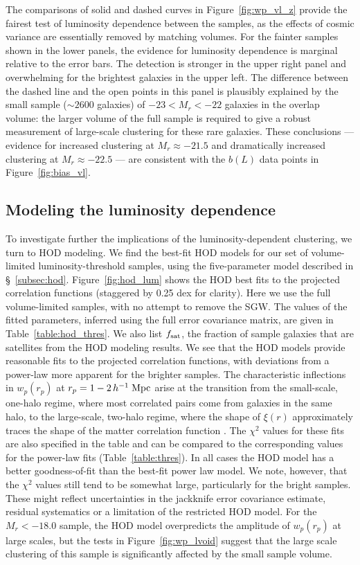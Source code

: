 \documentclass[]{emulateapj}
\newcommand{\hmpc}{\,h^{-1}\;{\rm Mpc}}
\newcommand{\wrp}{{w_p(r_p)}}
\begin{document}
The comparisons of solid and dashed curves in Figure~\ref{fig:wp_vl_z} 
provide the fairest test of luminosity dependence between the samples,
as the effects of cosmic variance are essentially removed by matching volumes.
For the fainter samples shown in the lower panels, the evidence for
luminosity dependence is marginal relative to the error bars.
The detection is stronger in the upper right panel and overwhelming
for the brightest galaxies in the upper left.
The difference between the dashed line and the open points in this panel
is plausibly explained by the small sample
($\sim 2600$ galaxies) of $-23 < M_r < -22$ galaxies in the overlap volume:
the larger volume of the full sample is required to give a robust
measurement of large-scale clustering for these rare galaxies.
These conclusions --- evidence for increased clustering at $M_r\approx -21.5$
and dramatically increased clustering at $M_r\approx -22.5$ --- are
consistent with the $b(L)$ data points in Figure~\ref{fig:bias_vl}.

\subsection{Modeling the luminosity dependence}
\label{subsec:hodlum}

To investigate further the implications of the luminosity-dependent clustering,
we turn to HOD modeling.  We find the best-fit HOD models for our set of
volume-limited luminosity-threshold samples, using the five-parameter model
described in \S~\ref{subsec:hod}.  Figure~\ref{fig:hod_lum} shows the HOD
best fits to the projected correlation functions (staggered by 0.25 dex 
for clarity).  Here we use the full volume-limited samples, with no
attempt to remove the SGW. The values of the fitted parameters, inferred using
the full error covariance matrix, are given in Table~\ref{table:hod_thres}. 
We also list $f_{\rm sat}$, the fraction of sample galaxies that are
satellites from the HOD modeling results.  We see that the HOD
models provide reasonable fits to the projected correlation functions, 
with deviations from a power-law more apparent for the brighter samples.
The characteristic inflections in $\wrp$ at $r_p=1-2\hmpc$ arise at
the transition from the small-scale, one-halo regime, where most 
correlated pairs come from galaxies in the same halo, to the
large-scale, two-halo regime, where the shape of $\xi(r)$ approximately
traces the shape of the matter correlation function
\citep{berlind02,zehavi04}.
The $\chi^2$ values for these fits are also specified in the table and can 
be compared to the corresponding values for the power-law fits 
(Table~\ref{table:thres}). In all cases the HOD model has
a better goodness-of-fit than the best-fit power law model.
We note, however, that the $\chi^2$ values still tend to be somewhat 
large, particularly for the bright samples. These might reflect 
uncertainties in the jackknife error covariance estimate, residual
systematics or a limitation of the restricted HOD model. 
% 
For the $M_r<-18.0$ sample, 
the HOD model overpredicts the amplitude of $\wrp$ at large scales,
but the tests in Figure~\ref{fig:wp_lvoid} suggest that the large
scale clustering of this sample is significantly affected by the
small sample volume.
\end{document}
